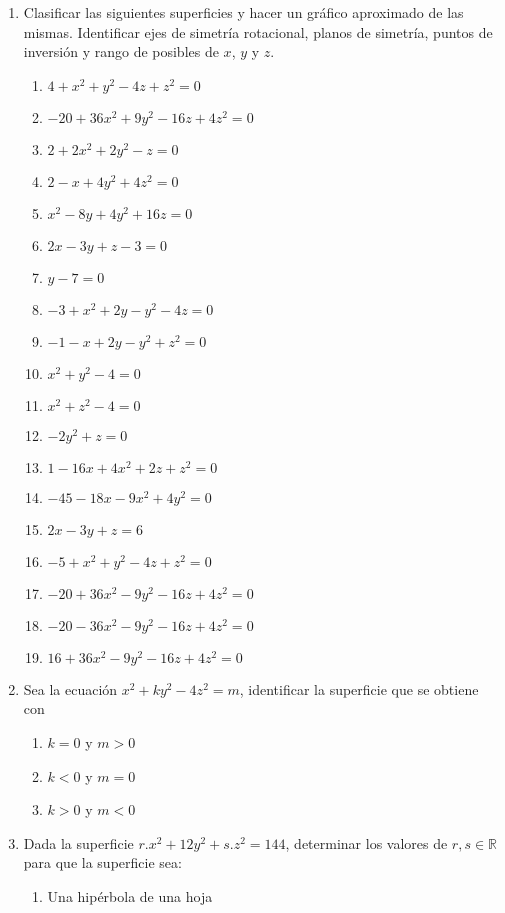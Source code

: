 \documentclass[a4paper]{article}
\newcommand{\exercise}{\item}
\begin{document}
\begin{enumerate}
	\exercise Clasificar las siguientes superficies y hacer un gráfico aproximado de las mismas. Identificar ejes de simetría rotacional, planos de simetría, puntos de inversión y rango de posibles de $x$, $y$ y $z$.
	\begin{multicols}{2}
	\begin{enumerate} [label=(\alph*)]
		\item $4+x^2+y^2-4z+z^2=0$
		\item $-20+36x^2+9y^2-16z+4z^2=0$
		\item $2+2x^2+2y^2-z=0$
		\item $2-x+4y^2+4z^2=0$
		\item $x^2-8y+4y^2+16z=0$
		\item $2x-3y+z-3=0$
		\item $y-7=0$
		\item $-3+x^2+2y-y^2-4z=0$
		\item $-1-x+2y-y^2+z^2=0$
		\item $x^2+y^2-4=0$
		\item $x^2+z^2-4=0$
		\item $-2y^2+z=0$
		\item $1-16x+4x^2+2z+z^2=0$
		\item $-45-18x-9x^2+4y^2=0$
		\item $2x-3y+z=6$
		\item $-5+x^2+y^2-4z+z^2=0$
		\item $-20+36x^2-9y^2-16z+4z^2=0$
		\item $-20-36x^2-9y^2-16z+4z^2=0$
		\item $16+36x^2-9y^2-16z+4z^2=0$
	\end{enumerate}
	\end{multicols}
	\exercise Sea la ecuación $x^2+ky^2-4z^2=m$, identificar la superficie que se obtiene con
	\begin{multicols}{2}
	\begin{enumerate} [label=(\alph*)]
		\item $k=0$ y $m>0$
		\item $k<0$ y $m=0$
		\item $k>0$ y $m<0$
	\end{enumerate}
	\end{multicols}
	\exercise Dada la superficie $r.x^2+12y^2+s.z^2=144$, determinar los valores de $r,s \in \mathbb{R}$ para que la superficie sea:
	\begin{multicols}{2}
	\begin{enumerate} [label=(\alph*)]
		\item Una hipérbola de una hoja

\end{enumerate}
\end{multicols}
\end{enumerate}
\end{document}
